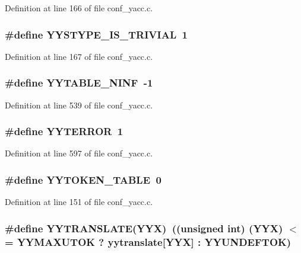 Definition at line 166 of file conf\_\-yacc.c.
\subsubsection[{YYSTYPE\_\-IS\_\-TRIVIAL}]{\setlength{\rightskip}{0pt plus 5cm}\#define YYSTYPE\_\-IS\_\-TRIVIAL~1}\label{conf__yacc_8c_2e3dbf169c5ee24cf6af37c61cf3995d}




Definition at line 167 of file conf\_\-yacc.c.
\subsubsection[{YYTABLE\_\-NINF}]{\setlength{\rightskip}{0pt plus 5cm}\#define YYTABLE\_\-NINF~-1}\label{conf__yacc_8c_504faa93b92f37fcc147f68e8d111a1d}




Definition at line 539 of file conf\_\-yacc.c.
\subsubsection[{YYTERROR}]{\setlength{\rightskip}{0pt plus 5cm}\#define YYTERROR~1}\label{conf__yacc_8c_d2b58b1851184ddb3b60fede50bc7946}




Definition at line 597 of file conf\_\-yacc.c.
\subsubsection[{YYTOKEN\_\-TABLE}]{\setlength{\rightskip}{0pt plus 5cm}\#define YYTOKEN\_\-TABLE~0}\label{conf__yacc_8c_3499e31aa832edc82b632ae811286a4b}




Definition at line 151 of file conf\_\-yacc.c.
\subsubsection[{YYTRANSLATE}]{\setlength{\rightskip}{0pt plus 5cm}\#define YYTRANSLATE(YYX)~((unsigned int) (YYX) $<$= YYMAXUTOK ? yytranslate[YYX] : YYUNDEFTOK)}\label{conf__yacc_8c_ad19ee88e33c02c4e720b28f78249bd7}




